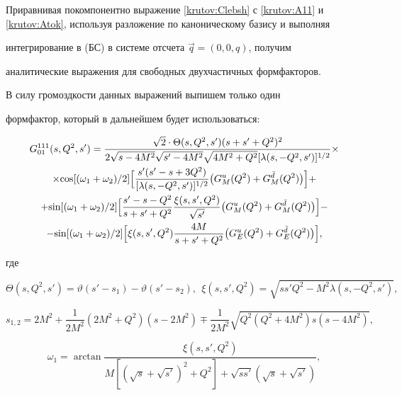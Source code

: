 Приравнивая покомпонентно выражение \eqref{krutov:Clebsh} с \eqref{krutov:A11} и \eqref{krutov:Atok}, используя разложение по каноническому базису и выполняя

интегрирование в (БС) в системе отсчета \mbox{$\vec{q}=(0, 0, q)$,} получим

аналитические выражения для свободных двухчастичных формфакторов.

В силу громоздкости данных выражений выпишем только один

формфактор, который в дальнейшем будет использоваться:

\begin{multline}\label{krutov:sv}

G_{01}^{111}(s,Q^2,s') =

\frac{\sqrt{2}\cdot\Theta(s,Q^2,s')(s+s'+Q^2)^{2}}{2\sqrt{s-4M^2}\sqrt{s'-4M^2}\sqrt{4M^2+Q^2}[\lambda(s,-Q^2,s')]^{1/2}}

\times

\\

\times

{\cos[({\omega_1}+{\omega_2})/2]}

\Bigl[\frac{s'(s'-s+3Q^2)}{[\lambda(s,-Q^2,s')]^{1/2}}\bigl(G_{M}^{u}(Q^2)+G_{M}^{\bar{d}}(Q^2)\bigr)\Bigr]+

\\

+{\sin[({\omega_1}+{\omega_2})/2]}

\Bigl[\frac{s'-s-Q^2}{s+s'+Q^2} \frac{\xi(s,s',Q^2)}{\sqrt{s'}}\bigl(G_{M}^{u}(Q^2)+G_{M}^{\bar{d}}(Q^2)\bigr)\Bigr]- 

\\

-{\sin[({\omega_1}+{\omega_2})/2]}

\Bigl[\xi(s,s',Q^2)\frac{4M}{s+s'+Q^2}\bigl(G_{E}^{u}(Q^2)+G_{E}^{\bar{d}}(Q^2)\bigr)

\Bigr],

\end{multline}

где

$$\Theta(s,Q^2,s')=\vartheta(s'-s_{1})-\vartheta(s'-s_{2}),~~ \xi(s,s',Q^2)=\sqrt{ss'Q^2-M^2\lambda(s,-Q^2,s')},$$

$$s_{1,2}=2M^{2}+\frac{1}{2M^2}(2M^2+Q^2)(s-2M^2)\mp\frac{1}{2M^2}\sqrt{Q^{2}(Q^{2}+4M^{2})s(s-4M^2)},$$


$$\omega_1=\arctan\frac{\xi(s,s',Q^2)}{M[(\sqrt{s}+\sqrt{s'})^2+Q^2]+\sqrt{ss'}(\sqrt{s}+\sqrt{s'})},$$

